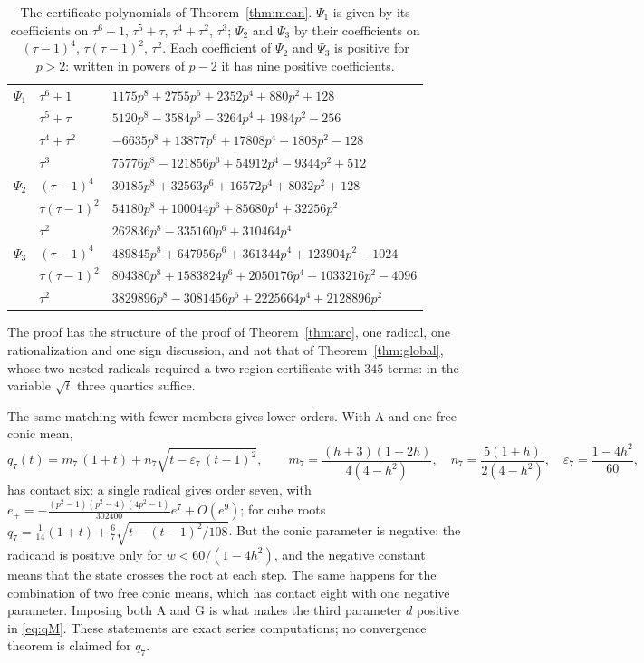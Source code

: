 \begin{table}[h]
\centering\small
\caption{The certificate polynomials of Theorem~\ref{thm:mean}. $\Psi_1$ is given by its coefficients on
$\tau^{6}+1$, $\tau^{5}+\tau$, $\tau^{4}+\tau^{2}$, $\tau^{3}$; $\Psi_2$ and $\Psi_3$ by their
coefficients on $(\tau-1)^{4}$, $\tau(\tau-1)^{2}$, $\tau^{2}$. Each coefficient of $\Psi_2$ and
$\Psi_3$ is positive for $p>2$: written in powers of $p-2$ it has nine positive
coefficients.}\label{tab:mean-cert}
\begin{tabular}{@{}lll@{}}
\toprule
$\Psi_1$ & $\tau^{6}+1$ & $1175p^{8}+2755p^{6}+2352p^{4}+880p^{2}+128$\\
 & $\tau^{5}+\tau$ & $5120p^{8}-3584p^{6}-3264p^{4}+1984p^{2}-256$\\
 & $\tau^{4}+\tau^{2}$ & $-6635p^{8}+13877p^{6}+17808p^{4}+1808p^{2}-128$\\
 & $\tau^{3}$ & $75776p^{8}-121856p^{6}+54912p^{4}-9344p^{2}+512$\\
\midrule
$\Psi_2$ & $(\tau-1)^{4}$ & $30185p^{8}+32563p^{6}+16572p^{4}+8032p^{2}+128$\\
 & $\tau(\tau-1)^{2}$ & $54180p^{8}+100044p^{6}+85680p^{4}+32256p^{2}$\\
 & $\tau^{2}$ & $262836p^{8}-335160p^{6}+310464p^{4}$\\
\midrule
$\Psi_3$ & $(\tau-1)^{4}$ & $489845p^{8}+647956p^{6}+361344p^{4}+123904p^{2}-1024$\\
 & $\tau(\tau-1)^{2}$ & $804380p^{8}+1583824p^{6}+2050176p^{4}+1033216p^{2}-4096$\\
 & $\tau^{2}$ & $3829896p^{8}-3081456p^{6}+2225664p^{4}+2128896p^{2}$\\
\bottomrule
\end{tabular}
\end{table}

The proof has the structure of the proof of Theorem~\ref{thm:arc}, one radical, one rationalization
and one sign discussion, and not that of Theorem~\ref{thm:global}, whose two nested radicals required a
two-region certificate with $345$ terms: in the variable $\sqrt t$ three quartics suffice.

\begin{remark}\label{rem:family}
The same matching with fewer members gives lower orders. With $\mathrm A$ and one free conic mean,
\[ q_7(t)=m_7\,(1+t)+n_7\sqrt{t-\varepsilon_7\,(t-1)^{2}},\qquad
m_7=\frac{(h+3)(1-2h)}{4(4-h^{2})},\quad n_7=\frac{5(1+h)}{2(4-h^{2})},\quad
\varepsilon_7=\frac{1-4h^{2}}{60}, \]
has contact six: a single radical gives order seven, with
$e_+=-\tfrac{(p^{2}-1)(p^{2}-4)(4p^{2}-1)}{302400}e^{7}+O(e^{9})$; for cube roots
$q_7=\tfrac1{14}(1+t)+\tfrac67\sqrt{t-(t-1)^{2}/108}$. But the conic parameter is negative: the radicand
is positive only for $w<60/(1-4h^{2})$, and the negative constant means that the state crosses the root
at each step. The same happens for the combination of two free conic means, which has contact eight
with one negative parameter. Imposing both $\mathrm A$ and $\mathrm G$ is what makes the third
parameter $d$ positive in \eqref{eq:qM}. These statements are exact series computations; no
convergence theorem is claimed for $q_7$.
\end{remark}

